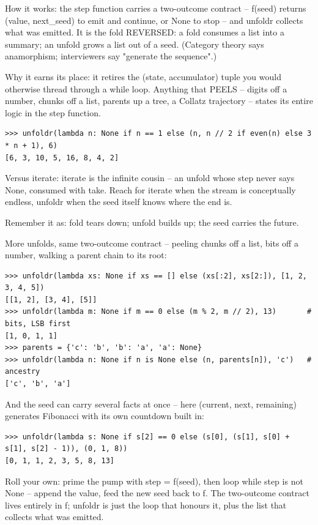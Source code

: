 \documentclass[10pt,letterpaper]{article}
\begin{document}
How it works: the step function carries a two-outcome contract -- f(seed) returns (value, next\_seed) to emit and continue, or None to stop -- and unfoldr collects what was emitted. It is the fold REVERSED: a fold consumes a list into a summary; an unfold grows a list out of a seed. (Category theory says anamorphism; interviewers say "generate the sequence".)


Why it earns its place: it retires the (state, accumulator) tuple you would otherwise thread through a while loop. Anything that PEELS -- digits off a number, chunks off a list, parents up a tree, a Collatz trajectory -- states its entire logic in the step function.

\begin{lstlisting}[style=ex]
>>> unfoldr(lambda n: None if n == 1 else (n, n // 2 if even(n) else 3 * n + 1), 6)
[6, 3, 10, 5, 16, 8, 4, 2]
\end{lstlisting}

Versus iterate: iterate is the infinite cousin -- an unfold whose step never says None, consumed with take. Reach for iterate when the stream is conceptually endless, unfoldr when the seed itself knows where the end is.


Remember it as: fold tears down; unfold builds up; the seed carries the future.


More unfolds, same two-outcome contract -- peeling chunks off a list, bits off a number, walking a parent chain to its root:

\begin{lstlisting}[style=ex]
>>> unfoldr(lambda xs: None if xs == [] else (xs[:2], xs[2:]), [1, 2, 3, 4, 5])
[[1, 2], [3, 4], [5]]
>>> unfoldr(lambda m: None if m == 0 else (m % 2, m // 2), 13)       # bits, LSB first
[1, 0, 1, 1]
>>> parents = {'c': 'b', 'b': 'a', 'a': None}
>>> unfoldr(lambda n: None if n is None else (n, parents[n]), 'c')   # ancestry
['c', 'b', 'a']
\end{lstlisting}

And the seed can carry several facts at once -- here (current, next, remaining) generates Fibonacci with its own countdown built in:

\begin{lstlisting}[style=ex]
>>> unfoldr(lambda s: None if s[2] == 0 else (s[0], (s[1], s[0] + s[1], s[2] - 1)), (0, 1, 8))
[0, 1, 1, 2, 3, 5, 8, 13]
\end{lstlisting}

Roll your own: prime the pump with step = f(seed), then loop while step is not None -- append the value, feed the new seed back to f. The two-outcome contract lives entirely in f; unfoldr is just the loop that honours it, plus the list that collects what was emitted.
\end{document}
